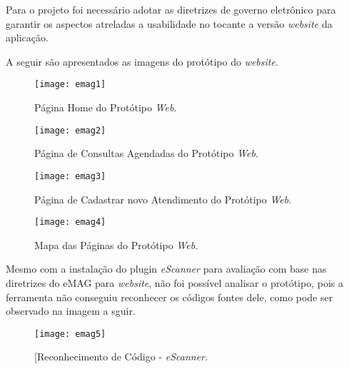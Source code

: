 	Para o projeto foi necessário adotar as diretrizes de governo eletrônico para garantir os aspectos atreladas a usabilidade no tocante a versão \emph{website} da aplicação.	

	\newpage
	\begin{landscape}
	A seguir são apresentados as imagens do protótipo do \emph{website}.
	
	\begin{figure}[h]
		\centering
		\texttt{[image: emag1]}
		\caption[Página Home do Protótipo Web]{Página Home do Protótipo \emph{Web}.}
		\label{fig:emag1}
	\end{figure}

	\begin{figure}[h]
		\centering
		\texttt{[image: emag2]}
		\caption[Página de Consultas Agendadas do Protótipo Web]{Página de Consultas Agendadas do Protótipo \emph{Web}.}
		\label{fig:emag2}
	\end{figure}

	\begin{figure}[h]
		\centering
		\texttt{[image: emag3]}
		\caption[Página de Cadastrar novo Atendimento do Protótipo Web]{Página de Cadastrar novo Atendimento do Protótipo \emph{Web}.}
		\label{fig:emag3}
	\end{figure}

	\begin{figure}[h]
		\centering
		\texttt{[image: emag4]}
		\caption[Mapa das Páginas do Protótipo Web]{Mapa das Páginas do Protótipo \emph{Web}.}
		\label{fig:emag4}
	\end{figure}
	\end{landscape}

	\newpage
	\begin{landscape}
	
	Mesmo com a instalação do plugin \emph{eScanner} para avaliação com base nas diretrizes do eMAG para \emph{website}, não foi possível analisar o protótipo, pois a ferramenta não conseguiu reconhecer os códigos fontes dele, como pode ser observado na imagem a sguir.

	\begin{figure}[h]
		\centering
		\texttt{[image: emag5]}
		\caption[Reconhecimento de Código - eScanner]{[Reconhecimento de Código - \emph{eScanner}.}
		\label{fig:emag5}
	\end{figure}
	\end{landscape}

	